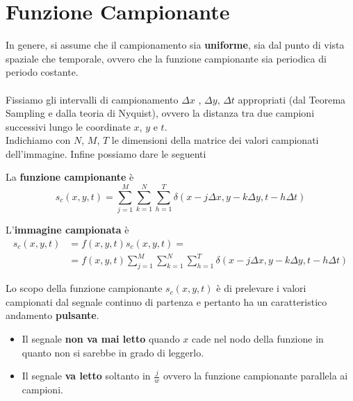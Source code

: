 \section{Funzione Campionante}
In genere, si assume che il campionamento sia \textbf{uniforme}, sia dal punto
di vista spaziale che temporale, ovvero che la funzione campionante sia
periodica di periodo costante. \\\\Fissiamo gli intervalli di campionamento
$\Delta x$ , $\Delta y$, $\Delta t$ appropriati (dal Teorema Sampling e dalla
teoria di Nyquist), ovvero la distanza tra due campioni successivi lungo le
coordinate $x$, $y$ e $t$.\\Indichiamo con $N$, $M$, $T$ le dimensioni della
matrice dei valori campionati dell'immagine. Infine possiamo dare le seguenti

\begin{definition}
    La \textbf{funzione campionante} è
    $$
        s_c(x,y,t) = \sum_{j=1}^{M} \sum_{k=1}^{N}\sum_{h=1}^{T} \delta (x-j\Delta x, y - k
        \Delta y, t - h  \Delta t )
    $$
\end{definition}

\begin{definition}
    L'\textbf{immagine campionata} è
    \begin{equation}
        \begin{aligned}
            s_c(x,y,t) & = f(x,y,t)s_c(x,y,t) =                                                                                         \\
                       & = f(x,y,t) \sum_{j=1}^{M} \sum_{k=1}^{N}\sum_{h=1}^{T} \delta (x-j \Delta x, y - k \Delta y, t - h  \Delta t )
        \end{aligned}
    \end{equation}
\end{definition}

Lo scopo della funzione campionante $s_c(x , y, t)$ è di prelevare i valori
campionati dal segnale continuo di partenza e pertanto ha un caratteristico
andamento \textbf{pulsante}.

\begin{itemize}
    \item Il segnale \textbf{non va mai letto} quando $x$ cade nel nodo della
          funzione in quanto non si sarebbe in grado di leggerlo.
    \item Il segnale \textbf{va letto} soltanto in $\frac{j}{w}$ ovvero la
          funzione campionante parallela ai campioni. 
\end{itemize}


